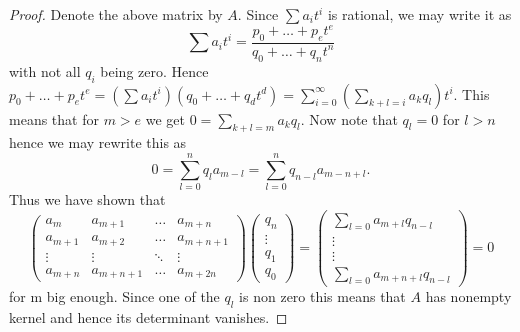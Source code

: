 \documentclass[11pt, a4paper, german, twoside]{article}
\theoremstyle{plain}
\theoremstyle{definition}
\begin{document}
\begin{proof}
    Denote the above matrix by $A$. Since $\sum a_it^i$ is rational, we may write it as
    \[
        \sum a_it^i = \frac{p_0 + \dots + p_et^e}{q_0 + \dots + q_n t^n}
    \]
    with not all $q_i$ being zero.
    Hence 
    $p_0 + \dots + p_et^e = \left(\sum a_it^i\right)\left(q_0 + \dots + q_d t^d\right) = \sum_{i=0}^{\infty} \left(\sum_{k+l=i} a_kq_l\right)t^i$.
    This means that for $m > e$ we get $0 = \sum_{k+l=m} a_kq_l$. Now note that $q_l = 0$ for $l > n$ hence we may rewrite this as
    \[
        0 = \sum_{l = 0}^{n} q_la_{m-l} = \sum_{l=0}^n q_{n-l}a_{m-n+l}.
    \]
    Thus we have shown that
    \[
        \begin{pmatrix}
            a_m     & a_{m+1} & \dots & a_{m+n} \\
            a_{m+1} & a_{m+2} & \dots & a_{m+n+1} \\
            \vdots  & \vdots  & \ddots & \vdots \\
            a_{m+n} & a_{m+n+1} & \dots & a_{m+2n}
        \end{pmatrix}
        \begin{pmatrix}
            q_n \\ \vdots \\ q_1 \\ q_0
        \end{pmatrix}
        =
        \begin{pmatrix}
            \sum_{l=0} a_{m+l}q_{n-l} \\ \vdots \\ \vdots \\ \sum_{l=0} a_{m+n+l}q_{n-l}
        \end{pmatrix}
        = 0
    \]
    for m big enough. Since one of the $q_l$ is non zero this means that $A$ has nonempty kernel and hence its determinant vanishes.
\end{proof}
\end{document}
